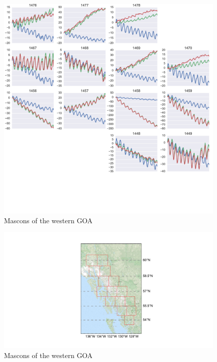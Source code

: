 \documentclass[review]{igs}
\begin{document}
\begin{figure}
\noindent\includegraphics[width=178mm]{figures/easternPlot} \centering \caption{Mascons of the western GOA} \label{fig:summer}
\end{figure}


\begin{figure}
\noindent\includegraphics[width=178mm]{figures/southeasternMap} \centering \caption{Mascons of the western GOA} \label{fig:summer}
\end{figure}
\end{document}
